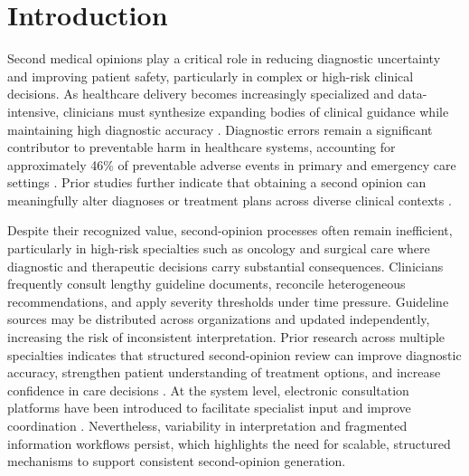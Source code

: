\documentclass[preprint,12pt]{elsarticle}
\begin{document}
\section{Introduction}
\label{sec:intro}

Second medical opinions play a critical role in reducing diagnostic uncertainty and improving patient safety, particularly in complex or high-risk clinical decisions. As healthcare delivery becomes increasingly specialized and data-intensive, clinicians must synthesize expanding bodies of clinical guidance while maintaining high diagnostic accuracy \cite{r0}. Diagnostic errors remain a significant contributor to preventable harm in healthcare systems, accounting for approximately 46\% of preventable adverse events in primary and emergency care settings \cite{r24}. Prior studies further indicate that obtaining a second opinion can meaningfully alter diagnoses or treatment plans across diverse clinical contexts \cite{r25,r26}.

Despite their recognized value, second-opinion processes often remain inefficient, particularly in high-risk specialties such as oncology and surgical care where diagnostic and therapeutic decisions carry substantial consequences. Clinicians frequently consult lengthy guideline documents, reconcile heterogeneous recommendations, and apply severity thresholds under time pressure. Guideline sources may be distributed across organizations and updated independently, increasing the risk of inconsistent interpretation. Prior research across multiple specialties indicates that structured second-opinion review can improve diagnostic accuracy, strengthen patient understanding of treatment options, and increase confidence in care decisions \cite{new1,new2,new3,new5,new6}. At the system level, electronic consultation platforms have been introduced to facilitate specialist input and improve coordination \cite{new4,new7}. Nevertheless, variability in interpretation and fragmented information workflows persist, which highlights the need for scalable, structured mechanisms to support consistent second-opinion generation.
\end{document}
